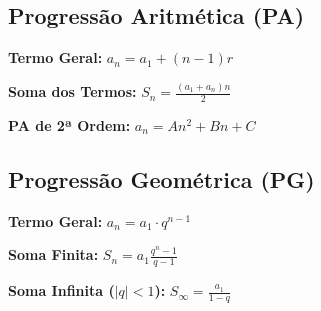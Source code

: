 \subsection{Progressão Aritmética (PA)}

\textbf{Termo Geral:} \quad $ a_n = a_1 + (n-1)r $

\textbf{Soma dos Termos:} \quad $ S_n = \frac{(a_1 + a_n)n}{2} $

\textbf{PA de 2ª Ordem:} \quad $ a_n = An^2 + Bn + C $

\subsection{Progressão Geométrica (PG)}

\textbf{Termo Geral:} \quad $ a_n = a_1 \cdot q^{n-1} $

\textbf{Soma Finita:} \quad $ S_n = a_1 \frac{q^n - 1}{q - 1} $

\textbf{Soma Infinita ($|q|<1$):} \quad $ S_{\infty} = \frac{a_1}{1 - q} $